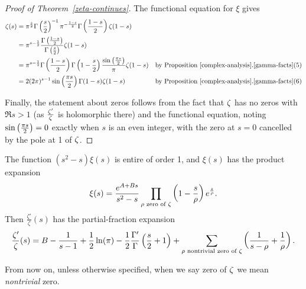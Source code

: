 \begin{proof}[Proof of Theorem~\ref{zeta-continues}]
The functional equation for $\xi$ gives
\begin{align*}
\zeta(s)&=\pi^{\frac{s}{2}} \Gamma\left( {\frac{s}{2}} \right)^{-1}\pi^{-\frac{1-s}{2}} \Gamma\left( {\frac{1-s}{2}} \right)\zeta(1-s)\\
&=\pi^{s-\frac{1}{2}} \frac{\Gamma\left( {\frac{1-s}{2}} \right)}{\Gamma\left( {\frac{s}{2}} \right)}\zeta(1-s)\\
&=\pi^{s-\frac{1}{2}}\Gamma\left( {\frac{1-s}{2}} \right) \Gamma\left( {1-\frac{s}{2}} \right) \frac{\sin\left( {\frac{\pi s}{2}} \right)}{\pi}\zeta(1-s)&\text{by Proposition~\ref{complex-analysis}.\ref{gamma-facts}(5)}\\
&=2(2\pi)^{s-1}\sin\left( {\frac{\pi s}{2}} \right)\Gamma(1-s)\zeta(1-s)&\text{by Proposition~\ref{complex-analysis}.\ref{gamma-facts}(6)}
\end{align*}

Finally, the statement about zeros follows from the fact that $\zeta$ has no zeros with $\Re s>1$ (as $\frac{\zeta'}{\zeta}$ is holomorphic there) and the functional equation, noting $\sin\left( {\frac{\pi s}{2}} \right)=0$ exactly when $s$ is an even integer, with the zero at $s=0$ cancelled by the pole at 1 of $\zeta$.
\end{proof}
\begin{thm}
The function $(s^2-s)\xi(s)$ is entire of order 1, and $\xi(s)$ has the product expansion
\[
\xi(s)=\frac{e^{A+Bs}}{s^2-s}\prod_{\rho\text{ zero of }\zeta} \left( {1-\frac s{\rho}} \right)e^{\frac s{\rho}}.
\]
Then $\frac{\zeta'}{\zeta}(s)$ has the partial-fraction expansion
\[
\frac{\zeta'}{\zeta}(s)=B-\frac{1}{s-1}+\frac{1}{2}\ln(\pi) -\frac{1}{2}\frac{\Gamma'}{\Gamma}\left( {\frac s2+1} \right)+\sum_{\rho\text{ nontrivial zero of }\zeta}\left( {\frac{1}{s-\rho}+\frac{1}{\rho}} \right).
\]
\end{thm}
From now on, unless otherwise specified, when we say zero of $\zeta$ we mean {\it nontrivial} zero.
